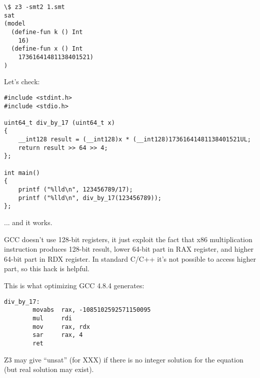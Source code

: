 \begin{lstlisting}
\$ z3 -smt2 1.smt
sat
(model
  (define-fun k () Int
    16)
  (define-fun x () Int
    17361641481138401521)
)
\end{lstlisting}

Let's check:

\begin{lstlisting}
#include <stdint.h>
#include <stdio.h>

uint64_t div_by_17 (uint64_t x)
{
	__int128 result = (__int128)x * (__int128)17361641481138401521UL;
	return result >> 64 >> 4;
};

int main()
{
	printf ("%lld\n", 123456789/17);
	printf ("%lld\n", div_by_17(123456789));
};
\end{lstlisting}

... and it works.

GCC doesn't use 128-bit registers, it just exploit the fact that x86 multiplication instruction produces 128-bit result, lower 64-bit part in RAX register,
and higher 64-bit part in RDX register.
In standard C/C++ it's not possible to access higher part, so this hack is helpful.

This is what optimizing GCC 4.8.4 generates:

\begin{lstlisting}
div_by_17:
        movabs  rax, -1085102592571150095
        mul     rdi
        mov     rax, rdx
        sar     rax, 4
        ret
\end{lstlisting}

Z3 may give ``unsat'' (for XXX) %
if there is no integer solution for the equation (but real solution may exist).

